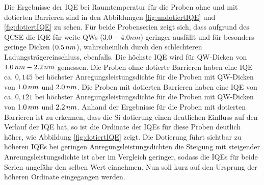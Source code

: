 \noindent 
% 
Die Ergebnisse der IQE bei Raumtemperatur für die Proben ohne und mit dotierten Barrieren sind in den Abbildungen 
\ref{fig:undotiertIQE} und \ref{fig:dotiertIQE} zu sehen. Für beide Probenserien zeigt sich, dass aufgrund des QCSE die IQE für weite QWs 
($3.0 -4.0  nm$) geringer ausfällt und für besonders geringe Dicken ($0.5\thinspace nm$), wahrscheinlich durch den schlechteren Ladungsträgereinschluss, ebenfalls. Die höchste IQE wird für QW-Dicken von $1.0 \thinspace nm- 2.2 \thinspace nm$ gemessen. Die Proben ohne dotierte Barrieren haben eine IQE ca. $0,145$ bei höchster Anregungsleistungsdichte für die Proben mit QW-Dicken von $1.0 \thinspace nm$ und $2.0\thinspace nm$. 
Die Proben mit dotierten Barrieren haben eine IQE von ca. $0,121$ bei höchster Anregungsleistungsdichte für die Proben mit QW-Dicken von $1.0 \thinspace nm$ und $2.2\thinspace nm$. Anhand der Ergebnisse für die Proben mit dotierten Barrieren ist zu erkennen, dass die Si-dotierung einen deutlichen Einfluss auf den Verlauf der IQE hat, so ist die Ordinate der IQEs für diese Proben deutlich höher, wie Abbildung \ref{fig:dotiertIQE} zeigt. Die Dotierung führt sichtbar zu höheren IQEs bei geringen Anregungsleistungsdichten die Steigung mit steigender Anreungsleistungsdichte ist aber im Vergleich geringer, sodass die IQEs für beide Serien ungefähr den selben Wert einnehmen.
Nun soll kurz auf den Ursprung der höheren Ordinate eingegangen werden.
%
